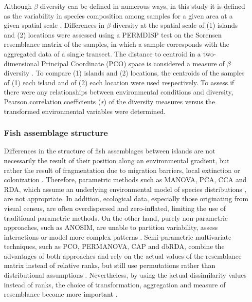 Although $\beta$ diversity can be defined in numerous ways, in this study it is defined as the variability in species composition among samples for a given area at a given spatial scale \citep{Anderson2006MultivariateDiversity,Whittaker1975CommunitiesEcosystems,Whittaker2001ScaleDiversity}. Differences in $\beta$ diversity at the spatial scale of (1) islands and (2) locations were assessed using a PERMDISP test on the Sorensen resemblance matrix of the samples, in which a sample corresponds with the aggregated data of a single transect. The distance to centroid in a two-dimensional Principal Coordinate (PCO) space is considered a measure of $\beta$ diversity \citep{Anderson2006MultivariateDiversity}. To compare (1) islands and (2) locations, the centroids of the samples of (1) each island and of (2) each location were used respectively. To assess if there were any relationships between environmental conditions and diversity, Pearson correlation coefficients (\textit{r}) of the diversity measures versus the transformed environmental variables were determined. 

\subsubsection{Fish assemblage structure}
\label{sect:struct}

Differences in the structure of fish assemblages between islands are not necessarily the result of their position along an environmental gradient, but rather the result of fragmentation due to migration barriers, local extinction or colonization \citep{Whittaker1998IslandConservation,Whittaker2017IslandLaboratories}. Therefore, parametric methods such as MANOVA, PCA, CCA and RDA, which assume an underlying environmental model of species distributions \citep{TerBraak1988AAnalysis}, are not appropriate. In addition, ecological data, especially those originating from visual census, are often overdispersed and zero-inflated, limiting the use of traditional parametric methods. On the other hand, purely non-parametric approaches, such as ANOSIM, are unable to partition variability, assess interactions or model more complex patterns \citep{Anderson2008PERMANOVA+Methods}. Semi-parametric multivariate techniques, such as PCO, PERMANOVA, CAP and dbRDA, combine the advantages of both approaches and rely on the actual values of the resemblance matrix instead of relative ranks, but still use permutations rather than distributional assumptions \citep{Anderson2008PERMANOVA+Methods}. Nevertheless, by using the actual dissimilarity values instead of ranks, the choice of transformation, aggregation and measure of resemblance become more important \citep{Anderson2008PERMANOVA+Methods}. 

